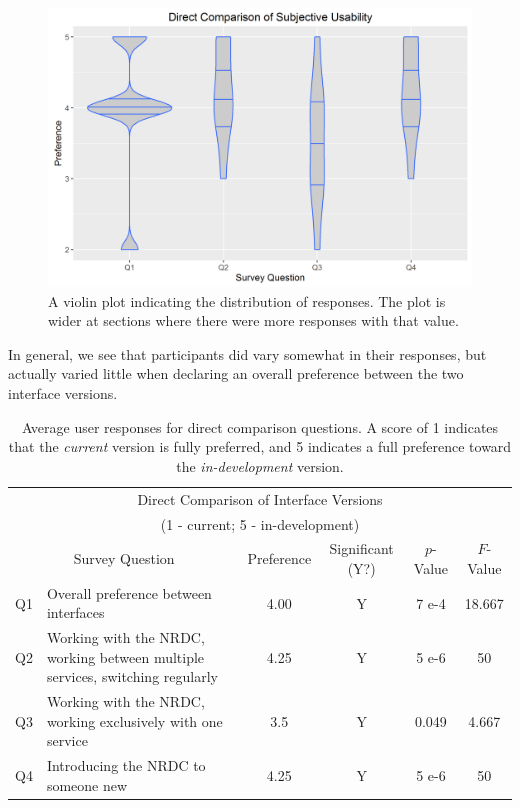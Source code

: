 \documentclass{article}
\begin{document}
\begin{figure}[h!]
  \centering
  \includegraphics[width=.6\linewidth]{direct_comparison_violin}
  \caption{A violin plot indicating the distribution of responses. The plot is wider at sections where there were more responses with that value.}
  \label{fig:subjective_direct}
\end{figure}

In general, we see that participants did vary somewhat in their responses, but actually varied little when declaring an overall preference between the two interface versions.

\begin{table}[h]
    \centering
    \begin{tabular}{| c | p{4cm} || c || c | c | c |}
    \hline
    \multicolumn{6}{|c|}{Direct Comparison of Interface Versions} \\
    \multicolumn{6}{|c|}{(1 - current; 5 - in-development)} \\
    \multicolumn{2}{|c||}{Survey Question} & Preference & Significant (Y?) & $p$-Value & $F$-Value \\
    \hline
    \hline
    Q1 & Overall preference between interfaces &
    4.00 & Y & 7 e-4 & 18.667 \\
    \hline
    Q2 & Working with the NRDC, working between multiple services, switching regularly &
    4.25 & Y & 5 e-6 & 50 \\
    \hline
    Q3 & Working with the NRDC, working exclusively with one service  &
    3.5 & Y & 0.049 & 4.667 \\
    \hline
    Q4 & Introducing the NRDC to someone new &
    4.25 & Y & 5 e-6 & 50 \\
    \hline
    \end{tabular}
    
    \caption{Average user responses for direct comparison questions. A score of 1 indicates that the \emph{current} version is fully preferred, and 5 indicates a full preference toward the \emph{in-development} version.}
    \label{tab:avg_direct_comparison}
\end{table}
\end{document}
